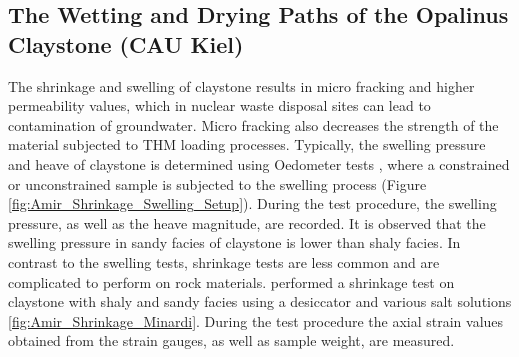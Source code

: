 \subsection{The Wetting and Drying Paths of the Opalinus Claystone (CAU Kiel)}
\label{sec:Shrinkage_Swelling_Exp}

The shrinkage and swelling of claystone results in micro fracking and higher permeability values, which in nuclear waste disposal sites can lead to contamination of groundwater. Micro fracking also decreases the strength of the material subjected to THM  loading processes. Typically, the swelling pressure and heave of claystone is determined using Oedometer tests \cite{Peronetal2009}, where a constrained or unconstrained sample is subjected to the swelling process (Figure \ref{fig:Amir_Shrinkage_Swelling_Setup}). During the test procedure, the swelling pressure, as well as the heave magnitude, are recorded. It is observed that the swelling pressure in sandy facies of claystone is lower than shaly facies. In contrast to the swelling tests, shrinkage tests are less common and are complicated to perform on rock materials. \cite{Minardietal2016} performed a shrinkage test on claystone with shaly and sandy facies using a desiccator and various salt solutions \ref{fig:Amir_Shrinkage_Minardi}. During the test procedure the axial strain values obtained from the strain gauges, as well as sample weight, are measured.


